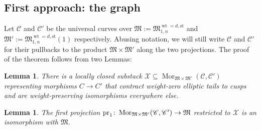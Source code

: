 \documentclass[11pt]{amsart}
\renewcommand{\to}{\rightarrow}
\newcommand{\pr}{\rm{pr}}
\theoremstyle{plain}
\newtheorem{lem}[thm]{Lemma}
\theoremstyle{definition}
\begin{document}
\subsection{First approach: the graph}

Let $\mathcal C$ and $\mathcal C'$ be the universal curves over $\mathfrak{M}:=\mathfrak M_{1,n}^{\operatorname{wt}=d,\text{st}}$ and $\mathfrak{M}':=\mathfrak M_{1,n}^{\operatorname{wt}=d,\text{st}}(1)$ respectively. Abusing notation, we will still write $\mathcal C$ and $\mathcal C'$ for their pullbacks to the product $\mathfrak{M}\times\mathfrak{M}'$ along the two projections. The proof of the theorem follows from two Lemmas:

\begin{lem}\label{lemma:def_X}
 There is a locally closed substack $\mathcal X\subseteq\operatorname{Mor}_{\mathfrak{M}\times\mathfrak{M}'}(\mathcal C,\mathcal C')$ representing morphisms $C\to C'$ that contract weight-zero elliptic tails to cusps and are weight-preserving isomorphisms everywhere else. 
\end{lem}

\begin{lem}\label{lamma:projection_iso}
 The first projection $\pr_1\colon \operatorname{Mor}_{\mathfrak{M}\times\mathfrak{M}'}(\mathcal C,\mathcal C')\to\mathfrak M$ restricted to $\mathcal X$ is an isomorphism with $\mathfrak M$.
\end{lem}
\end{document}
